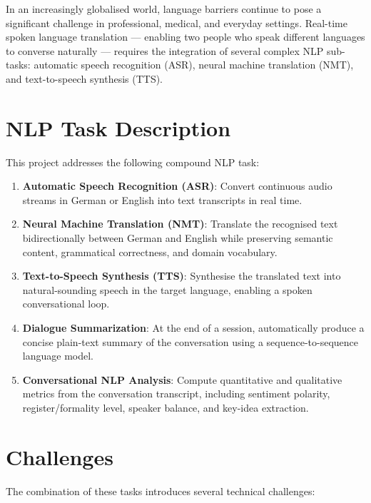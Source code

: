 \documentclass[12pt,a4paper]{report}
\begin{document}
In an increasingly globalised world, language barriers continue to pose a
significant challenge in professional, medical, and everyday settings.
Real-time spoken language translation — enabling two people who speak
different languages to converse naturally — requires the integration of
several complex NLP sub-tasks: automatic speech recognition (ASR),
neural machine translation (NMT), and text-to-speech synthesis (TTS).

\section{NLP Task Description}

This project addresses the following compound NLP task:

\begin{enumerate}
  \item \textbf{Automatic Speech Recognition (ASR)}: Convert continuous
        audio streams in German or English into text transcripts in real
        time.
  \item \textbf{Neural Machine Translation (NMT)}: Translate the
        recognised text bidirectionally between German and English while
        preserving semantic content, grammatical correctness, and domain
        vocabulary.
  \item \textbf{Text-to-Speech Synthesis (TTS)}: Synthesise the
        translated text into natural-sounding speech in the target
        language, enabling a spoken conversational loop.
  \item \textbf{Dialogue Summarization}: At the end of a session,
        automatically produce a concise plain-text summary of the
        conversation using a sequence-to-sequence language model.
  \item \textbf{Conversational NLP Analysis}: Compute quantitative and
        qualitative metrics from the conversation transcript, including
        sentiment polarity, register/formality level, speaker balance,
        and key-idea extraction.
\end{enumerate}

\section{Challenges}

The combination of these tasks introduces several technical challenges:
\end{document}
